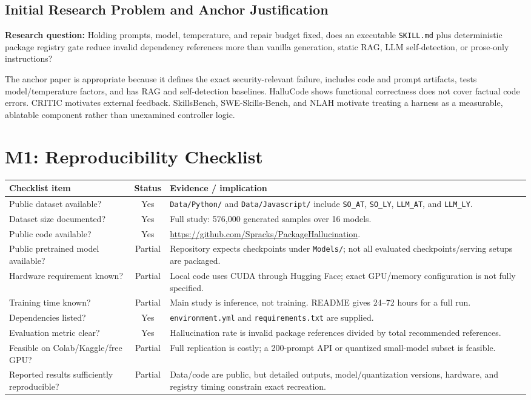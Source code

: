 \documentclass[11pt,a4paper]{article}
\begin{document}
\subsection{Initial Research Problem and Anchor Justification}
\textbf{Research question:} Holding prompts, model, temperature, and repair budget fixed, does an executable \texttt{SKILL.md} plus deterministic package registry gate reduce invalid dependency references more than vanilla generation, static RAG, LLM self-detection, or prose-only instructions?

The anchor paper is appropriate because it defines the exact security-relevant failure, includes code and prompt artifacts, tests model/temperature factors, and has RAG and self-detection baselines. HalluCode shows functional correctness does not cover factual code errors. CRITIC motivates external feedback. SkillsBench, SWE-Skills-Bench, and NLAH motivate treating a harness as a measurable, ablatable component rather than unexamined controller logic.

\section{M1: Reproducibility Checklist}
\small
\begin{tabularx}{\linewidth}{p{6.1cm}cX}
\toprule
\textbf{Checklist item} & \textbf{Status} & \textbf{Evidence / implication}\\
\midrule
Public dataset available? & Yes & \texttt{Data/Python/} and \texttt{Data/Javascript/} include \texttt{SO\_AT}, \texttt{SO\_LY}, \texttt{LLM\_AT}, and \texttt{LLM\_LY}.\\
Dataset size documented? & Yes & Full study: 576,000 generated samples over 16 models.\\
Public code available? & Yes & \url{https://github.com/Spracks/PackageHallucination}.\\
Public pretrained model available? & Partial & Repository expects checkpoints under \texttt{Models/}; not all evaluated checkpoints/serving setups are packaged.\\
Hardware requirement known? & Partial & Local code uses CUDA through Hugging Face; exact GPU/memory configuration is not fully specified.\\
Training time known? & Partial & Main study is inference, not training. README gives 24--72 hours for a full run.\\
Dependencies listed? & Yes & \texttt{environment.yml} and \texttt{requirements.txt} are supplied.\\
Evaluation metric clear? & Yes & Hallucination rate is invalid package references divided by total recommended references.\\
Feasible on Colab/Kaggle/free GPU? & Partial & Full replication is costly; a 200-prompt API or quantized small-model subset is feasible.\\
Reported results sufficiently reproducible? & Partial & Data/code are public, but detailed outputs, model/quantization versions, hardware, and registry timing constrain exact recreation.\\
\bottomrule
\end{tabularx}
\normalsize
\end{document}

